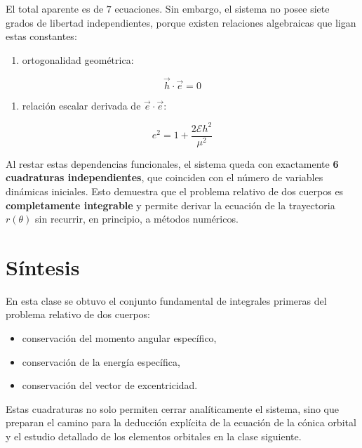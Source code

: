El total aparente es de \(7\) ecuaciones. Sin embargo, el sistema no posee siete grados de libertad independientes, porque existen relaciones algebraicas que ligan estas constantes:
\begin{enumerate}
    \item ortogonalidad geométrica:
\end{enumerate}
\[
\vec{h} \cdot \vec{e} = 0
\]
\begin{enumerate}[resume]
    \item relación escalar derivada de \(\vec{e} \cdot \vec{e}\):
\end{enumerate}
\[
 e^2 = 1 + \frac{2\mathcal{E}h^2}{\mu^2}
\]

Al restar estas dependencias funcionales, el sistema queda con exactamente \textbf{6 cuadraturas independientes}, que coinciden con el número de variables dinámicas iniciales. Esto demuestra que el problema relativo de dos cuerpos es \textbf{completamente integrable} y permite derivar la ecuación de la trayectoria \(r(\theta)\) sin recurrir, en principio, a métodos numéricos.

\section{Síntesis}
En esta clase se obtuvo el conjunto fundamental de integrales primeras del problema relativo de dos cuerpos:
\begin{itemize}
    \item conservación del momento angular específico,
    \item conservación de la energía específica,
    \item conservación del vector de excentricidad.
\end{itemize}

Estas cuadraturas no solo permiten cerrar analíticamente el sistema, sino que preparan el camino para la deducción explícita de la ecuación de la cónica orbital y el estudio detallado de los elementos orbitales en la clase siguiente.